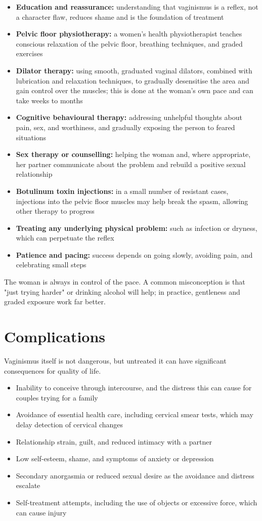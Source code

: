 \begin{itemize}
    \item \textbf{Education and reassurance:} understanding that vaginismus is a reflex, not a character flaw, reduces shame and is the foundation of treatment
    \item \textbf{Pelvic floor physiotherapy:} a women's health physiotherapist teaches conscious relaxation of the pelvic floor, breathing techniques, and graded exercises
    \item \textbf{Dilator therapy:} using smooth, graduated vaginal dilators, combined with lubrication and relaxation techniques, to gradually desensitise the area and gain control over the muscles; this is done at the woman's own pace and can take weeks to months
    \item \textbf{Cognitive behavioural therapy:} addressing unhelpful thoughts about pain, sex, and worthiness, and gradually exposing the person to feared situations
    \item \textbf{Sex therapy or counselling:} helping the woman and, where appropriate, her partner communicate about the problem and rebuild a positive sexual relationship
    \item \textbf{Botulinum toxin injections:} in a small number of resistant cases, injections into the pelvic floor muscles may help break the spasm, allowing other therapy to progress
    \item \textbf{Treating any underlying physical problem:} such as infection or dryness, which can perpetuate the reflex
    \item \textbf{Patience and pacing:} success depends on going slowly, avoiding pain, and celebrating small steps
\end{itemize}

The woman is always in control of the pace. A common misconception is that "just trying harder" or drinking alcohol will help; in practice, gentleness and graded exposure work far better.

\section*{Complications}
Vaginismus itself is not dangerous, but untreated it can have significant consequences for quality of life.

\begin{itemize}
    \item Inability to conceive through intercourse, and the distress this can cause for couples trying for a family
    \item Avoidance of essential health care, including cervical smear tests, which may delay detection of cervical changes
    \item Relationship strain, guilt, and reduced intimacy with a partner
    \item Low self-esteem, shame, and symptoms of anxiety or depression
    \item Secondary anorgasmia or reduced sexual desire as the avoidance and distress escalate
    \item Self-treatment attempts, including the use of objects or excessive force, which can cause injury
\end{itemize}

